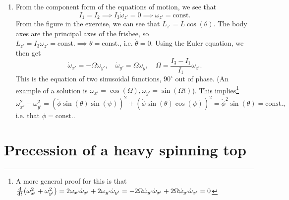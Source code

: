\documentclass{article}
\begin{document}
\begin{enumerate}[label=(\alph*)]
    \item From the component form of the equations of motion, we see that 
        \begin{equation*}
            I_1 = I_2 \implies I_3 \dot \omega_{z'} = 0 \implies \omega_{z'} = \mathrm{const.}
        \end{equation*}
        From the figure in the exercise, we can see that $L_{z'} = L \cos(\theta)$. The body axes are the principal axes of the frisbee, so $L_{z'} = I_3 \omega_{z'} = \mathrm{const.} \implies \theta = \mathrm{const.}$, i.e. $\dot \theta = 0$. Using the Euler equation, we then get
        \begin{equation*}
            \dot \omega_{x'} = -\Omega \omega_{y'}, \quad \dot \omega_{y'} = \Omega \omega_{y}, \quad \Omega = \frac{I_3 - I_1}{I_1} \omega_{z'}.
        \end{equation*}
        This is the equation of two sinusoidal functions, $90^\circ$ out of phase. (An example of a solution is $\omega_{x'} = \cos(\Omega), \omega_{y'} = \sin(\Omega t)$). This implies\footnote{A more general proof for this is that $\dv t (\omega_{x'}^2 + \omega_{y'}^2) = 2\omega_{x'} \dot \omega_{x'} + 2 \omega_{y'} \dot \omega_{y'} = -2\Omega \dot \omega_{y'} \dot \omega_{x'} + 2\Omega \dot \omega_{y'} \dot \omega_{x'} = 0$ }
        \begin{equation*}
            \omega_{x'}^2 + \omega_{y'}^2 = \left( \dot \phi \sin(\theta) \sin(\psi) \right)^2 + \left( \dot \phi \sin(\theta)\cos(\psi) \right)^2 = \dot \phi^2 \sin(\theta) = \mathrm{const.},
        \end{equation*}
        i.e. that $\phi = \mathrm{const.}$.

    \end{enumerate}

    \section{Precession of a heavy spinning top}
\end{document}
